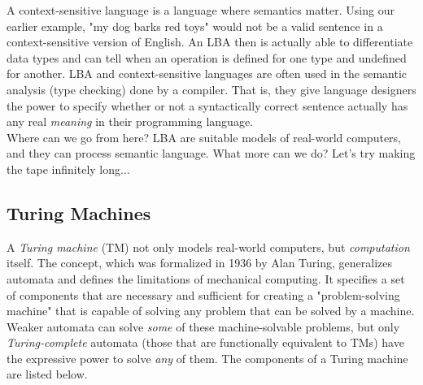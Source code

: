 A context-sensitive language is a language where semantics matter. Using our earlier example, "my dog barks red toys" would not be a valid sentence in a context-sensitive version of English. An LBA then is actually able to differentiate data types and can tell when an operation is defined for one type and undefined for another. LBA and context-sensitive languages are often used in the semantic analysis (type checking) done by a compiler. That is, they give language designers the power to specify whether or not a syntactically correct sentence actually has any real \textit{meaning} in their programming language. \\

Where can we go from here? LBA are suitable models of real-world computers, and they can process semantic language. What more can we do? Let's try making the tape infinitely long$\dots$ \\

\subsection{Turing Machines}

A \textit{Turing machine} (TM) not only models real-world computers, but \textit{computation} itself. The concept, which was formalized in 1936 by Alan Turing, generalizes automata and defines the limitations of mechanical computing. It specifies a set of components that are necessary and sufficient for creating a "problem-solving machine" that is capable of solving any problem that can be solved by a machine. Weaker automata can solve \textit{some} of these machine-solvable problems, but only \textit{Turing-complete} automata (those that are functionally equivalent to TMs) have the expressive power to solve \textit{any} of them. The components of a Turing machine are listed below.

